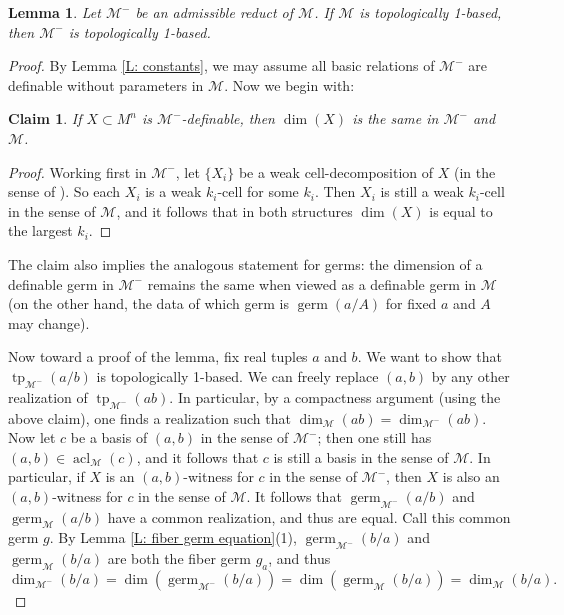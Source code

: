 \documentclass{amsart}
\newtheorem{lemma}[theorem]{Lemma}
\newtheorem{claim}[theorem]{Claim}
\theoremstyle{definition}
\newcommand{\acl}{\operatorname{acl}}
\newcommand{\tp}{\operatorname{tp}}
\begin{document}
\begin{lemma}\label{L: reducts}
    Let $\mathcal M^-$ be an admissible reduct of $\mathcal M$. If $\mathcal M$ is topologically 1-based, then $\mathcal M^-$ is topologically 1-based. 
\end{lemma}
\begin{proof}
    By Lemma \ref{L: constants}, we may assume all basic relations of $\mathcal M^-$ are definable without parameters in $\mathcal M$. Now we begin with:
    \begin{claim}
        If $X\subset M^n$ is $\mathcal M^-$-definable, then $\dim(X)$ is the same in $\mathcal M^-$ and $\mathcal M$.
    \end{claim}
    \begin{proof} Working first in $\mathcal M^-$, let $\{X_i\}$ be a weak cell-decomposition of $X$ (in the sense of \cite[Proposition 2.50]{t-minimal-johnson}). So each $X_i$ is a weak $k_i$-cell for some $k_i$. Then $X_i$ is still a weak $k_i$-cell in the sense of $\mathcal M$, and it follows that in both structures $\dim(X)$ is equal to the largest $k_i$.
    \end{proof}

    The claim also implies the analogous statement for germs: the dimension of a definable germ in $\mathcal M^-$ remains the same when viewed as a definable germ in $\mathcal M$  (on the other hand, the data of which germ is $\operatorname{germ}(a/A)$ for fixed $a$ and $A$ may change).
    
    Now toward a proof of the lemma, fix real tuples $a$ and $b$. We want to show that $\tp_{\mathcal M^-}(a/b)$ is topologically 1-based. We can freely replace $(a,b)$ by any other realization of $\tp_{\mathcal M^-}(ab)$. In particular, by a compactness argument (using the above claim), one finds a realization such that $\dim_{\mathcal M}(ab)=\dim_{\mathcal M^-}(ab)$. Now let $c$ be a basis of $(a,b)$ in the sense of $\mathcal M^-$; then one still has $(a,b)\in\acl_{\mathcal M}(c)$, and it follows that $c$ is still a basis in the sense of $\mathcal M$. In particular, if $X$ is an $(a,b)$-witness for $c$ in the sense of $\mathcal M^-$, then $X$ is also an $(a,b)$-witness for $c$ in the sense of $\mathcal M$. It follows that $\operatorname{germ}_{\mathcal M^-}(a/b)$ and $\operatorname{germ}_{\mathcal M}(a/b)$ have a common realization, and thus are equal. Call this common germ $g$. By Lemma \ref{L: fiber germ equation}(1), $\operatorname{germ}_{\mathcal M^-}(b/a)$ and $\operatorname{germ}_{\mathcal M}(b/a)$ are both the fiber germ $g_a$, and thus $$\dim_{\mathcal M^-}(b/a)=\dim(\operatorname{germ}_{\mathcal M^-}(b/a))=\dim(\operatorname{germ}_{\mathcal M}(b/a))=\dim_{\mathcal M}(b/a).$$


\end{proof}
\end{document}
